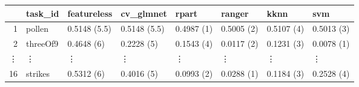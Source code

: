 \begin{table}[ht]
\centering
\begin{tabular}{rlllllll}
  \hline
 & task\_id & featureless & cv\_glmnet & rpart & ranger & kknn & svm \\
  \hline
1 & pollen & 0.5148 (5.5) & 0.5148 (5.5) & 0.4987 (1) & 0.5005 (2) & 0.5107 (4) & 0.5013 (3) \\
  2 & threeOf9 & 0.4648 (6) & 0.2228 (5) & 0.1543 (4) & 0.0117 (2) & 0.1231 (3) & 0.0078 (1) \\
  \vdots & \vdots & \vdots & \vdots & \vdots & \vdots & \vdots & \vdots \\
 16 & strikes & 0.5312 (6) & 0.4016 (5) & 0.0993 (2) & 0.0288 (1) & 0.1184 (3) & 0.2528 (4) \\
   \hline
\end{tabular}
\end{table}
